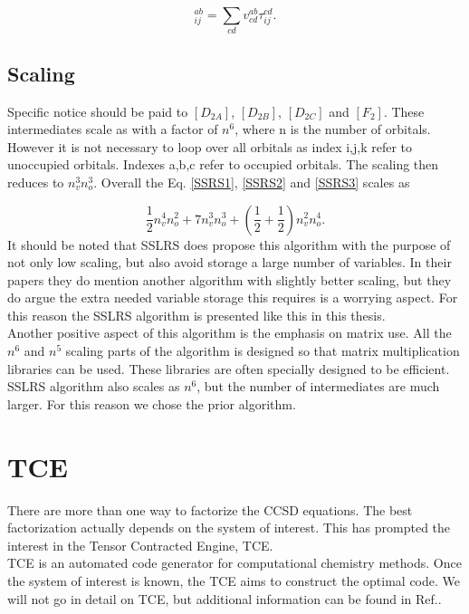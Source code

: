 \documentclass[a4paper,norsk,11pt,twoside]{report}
\begin{document}
\begin{equation}
[F_2]_{ij}^{ab} = \sum_{cd} v_{cd}^{ab} \tau_{ij}^{cd} .
\end{equation}

\subsection{Scaling}
Specific notice should be paid to $[D_{2A}]$, $[D_{2B}]$, $[D_{2C}]$ and $[F_{2}]$. These intermediates scale as with a factor of $n^6$, where n is the number of orbitals. However it is not necessary to loop over all orbitals as index i,j,k refer to unoccupied orbitals. Indexes a,b,c refer to occupied orbitals. The scaling then reduces to $n_v^3 n_o^3$. Overall the Eq. \eqref{SSRS1}, \eqref{SSRS2} and \eqref{SSRS3} scales as 

\begin{equation}
\frac{1}{2} n_v^4 n_o^2 + 7 n_v^3 n_o^3 + \left( \frac{1}{2} + \frac{1}{2} \right) n_v^2 n_o^4 . 
\end{equation} 
It should be noted that SSLRS does propose this algorithm with the purpose of not only low scaling, but also avoid storage a large number of variables. In their papers they do mention another algorithm with slightly better scaling, but they do argue the extra needed variable storage this requires is a worrying aspect. For this reason the SSLRS algorithm is presented like this in this thesis.\\

Another positive aspect of this algorithm is the emphasis on matrix use. All the $n^6$ and $n^5$ scaling parts of the algorithm is designed so that matrix multiplication libraries can be used. These libraries are often specially designed to be efficient. \\

SSLRS algorithm also scales as $n^6$, but the number of intermediates are much larger. For this reason we chose the prior algorithm.

\section{TCE}
There are more than one way to factorize the CCSD equations. The best factorization actually depends on the system of interest. This has prompted the interest in the Tensor Contracted Engine, TCE. \\

TCE is an automated code generator for computational chemistry methods. Once the system of interest is known, the TCE aims to construct the optimal code. We will not go in detail on TCE, but additional information can be found in Ref.\cite{tce_citation_numbah_10}. 
\end{document}

